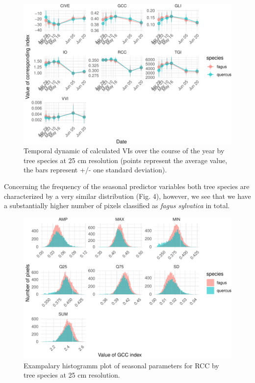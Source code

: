 \documentclass[]{article}
\begin{document}
\begin{figure}[H]

{\centering \includegraphics{report_files/figure-latex/predictor_plots_indices-1} 

}

\caption{Temporal dynamic of calculated VIs over the course of the year by tree species at 25 cm resolution (points represent the average value, the bars represent +/- one standard deviation).}\label{fig:predictor_plots_indices}
\end{figure}

Concerning the frequency of the seasonal predictor variables both tree
species are characterized by a very similar distribution (Fig. 4),
however, we see that we have a substantially higher number of pixels
classified as \emph{fagus sylvatica} in total.

\begin{figure}[H]

{\centering \includegraphics{report_files/figure-latex/example_seasonal_plots-1} 

}

\caption{Exampalary histogramm plot of seasonal parameters for RCC by tree species at 25 cm resolution.}\label{fig:example_seasonal_plots}
\end{figure}
\end{document}
